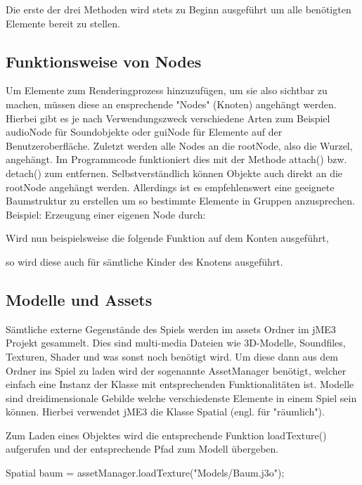 Die erste der drei Methoden wird stets zu Beginn ausgeführt um alle benötigten Elemente bereit zu stellen.

\subsection{Funktionsweise von Nodes}
Um Elemente zum Renderingprozess hinzuzufügen, um sie also sichtbar zu machen, müssen diese an ensprechende "Nodes" (Knoten) angehängt werden.
Hierbei gibt es je nach Verwendungszweck verschiedene Arten zum Beispiel audioNode für Soundobjekte oder guiNode für Elemente auf der Benutzeroberfläche.
Zuletzt werden alle Nodes an die rootNode, also die Wurzel, angehängt. Im  Programmcode funktioniert dies mit der Methode attach() bzw. detach() zum entfernen.
Selbstverständlich können Objekte auch direkt an die rootNode angehängt werden.
Allerdings ist es empfehlenswert eine geeignete Baumstruktur zu erstellen um so bestimmte Elemente in Gruppen anzusprechen.
\bigskip
Beispiel: Erzeugung einer eigenen Node durch:
\begin{center}
\end{center}

Wird nun beispielsweise die folgende Funktion auf dem Konten ausgeführt,
\begin{center}
\end{center}

so wird diese auch für sämtliche Kinder des Knotens ausgeführt.


\subsection{Modelle und Assets}
Sämtliche externe Gegenstände des Spiels werden im assets Ordner im jME3 Projekt gesammelt. Dies sind multi-media Dateien wie 3D-Modelle, Soundfiles, Texturen, Shader und was sonst noch benötigt wird.
Um diese dann aus dem Ordner ins Spiel zu laden wird der sogenannte AssetManager benötigt, welcher einfach eine Instanz der Klasse mit entsprechenden Funktionalitäten ist.
Modelle sind dreidimensionale Gebilde welche verschiedenste Elemente in einem Spiel sein können. Hierbei verwendet jME3 die Klasse Spatial (engl. für "räumlich"). 

Zum Laden eines Objektes wird die entsprechende Funktion loadTexture() aufgerufen und der entsprechende Pfad zum Modell übergeben.

\begin{center}
{Spatial baum = assetManager.loadTexture("Models/Baum.j3o");}
\end{center}

